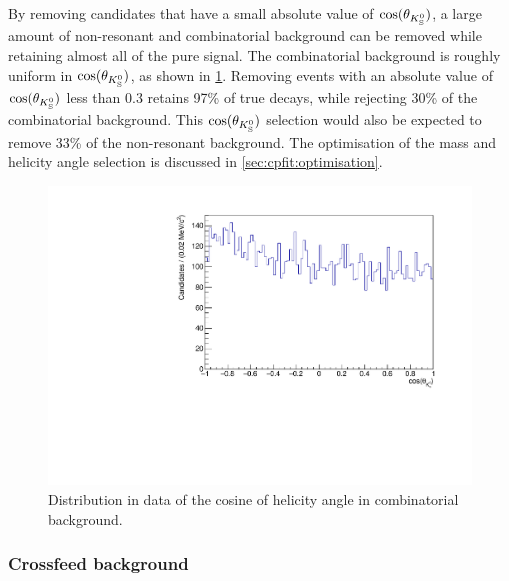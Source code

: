 By removing candidates that have a small absolute value of $\cos(\theta_{{{K}^0_{\mathrm{ \scriptscriptstyle S}}}})$, a large amount of non-resonant \decay{\Bm}{\D\KS\pim} and combinatorial background can be removed while retaining almost all of the pure \decay{\Bm}{\D\Kstarm} signal. The combinatorial background is roughly uniform in $\cos(\theta_{{{K}^0_{\mathrm{ \scriptscriptstyle S}}}})$, as shown in \fig\ref{Kshelicitybkg}. Removing events with an absolute value of $\cos(\theta_{{{K}^0_{\mathrm{ \scriptscriptstyle S}}}})$ less than 0.3 retains 97\% of true \decay{\Bm}{\D\Kstarm} decays, while rejecting 30\% of the combinatorial background. This $\cos(\theta_{{{K}^0_{\mathrm{ \scriptscriptstyle S}}}})$ selection would also be expected to remove 33\% of the non-resonant \decay{\Bm}{\D\KS\pim} background. The optimisation of the \Kstarm mass and \KS helicity angle selection is discussed in \sect\ref{sec:cpfit:optimisation}.

\begin{figure}
\centering
\includegraphics[width=0.5\linewidth]{figures/backgrounds/Kshelicity_background.pdf}
\caption{Distribution in data of the cosine of \KS helicity angle in \kpi combinatorial background.}
\label{Kshelicitybkg}
\end{figure}

\subsubsection{Crossfeed background}
\label{sec:backgrounds:crossfeed}

